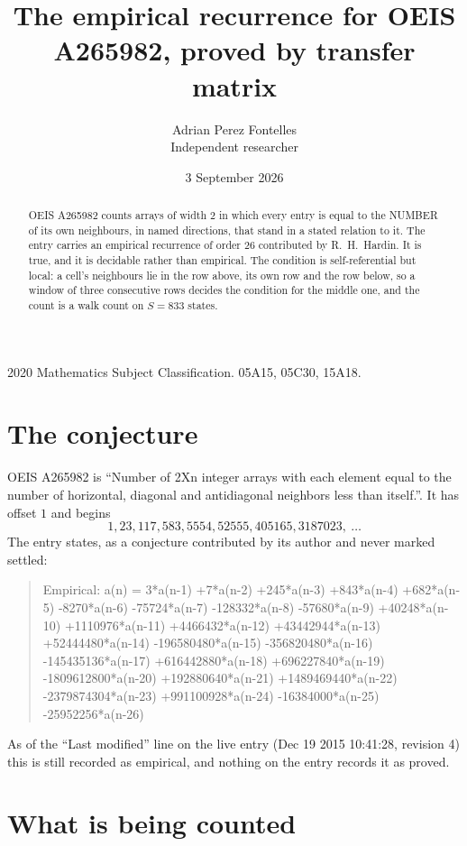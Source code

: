 \documentclass[11pt,a4paper]{article}
\title{The empirical recurrence for OEIS A265982, proved by transfer matrix}
\author{Adrian Perez Fontelles\\ \small Independent researcher}
\date{3 September 2026}
\theoremstyle{plain}
\theoremstyle{definition}
\begin{document}
\maketitle

\begin{abstract}
OEIS A265982 counts arrays of width $2$ in which every entry is equal to the NUMBER of its own
neighbours, in named directions, that stand in a stated relation to it. The entry carries an
empirical recurrence of order $26$ contributed by R.~H.~Hardin. It is true, and it is
decidable rather than empirical. The condition is self-referential but local: a cell's
neighbours lie in the row above, its own row and the row below, so a window of three
consecutive rows decides the condition for the middle one, and the count is a walk count on
$S=833$ states.
\end{abstract}

\noindent\small 2020 Mathematics Subject Classification. 05A15, 05C30, 15A18.\normalsize

\section{The conjecture}

OEIS A265982 is ``Number of 2Xn integer arrays with each element equal to the number of horizontal, diagonal and antidiagonal neighbors less than itself.''. It has offset $1$ and begins
\[
1, 23, 117, 583, 5554, 52555, 405165, 3187023,\ \dots
\]
The entry states, as a conjecture contributed by its author and never marked settled:
\begin{quote}
Empirical: a(n) = 3*a(n-1) +7*a(n-2) +245*a(n-3) +843*a(n-4) +682*a(n-5) -8270*a(n-6) -75724*a(n-7) -128332*a(n-8) -57680*a(n-9) +40248*a(n-10) +1110976*a(n-11) +4466432*a(n-12) +43442944*a(n-13) +52444480*a(n-14) -196580480*a(n-15) -356820480*a(n-16) -145435136*a(n-17) +616442880*a(n-18) +696227840*a(n-19) -1809612800*a(n-20) +192880640*a(n-21) +1489469440*a(n-22) -2379874304*a(n-23) +991100928*a(n-24) -16384000*a(n-25) -25952256*a(n-26)
\end{quote}
As of the ``Last modified'' line on the live entry (Dec 19 2015 10:41:28, revision 4) this is still
recorded as empirical, and nothing on the entry records it as proved.

\section{What is being counted}
\end{document}
